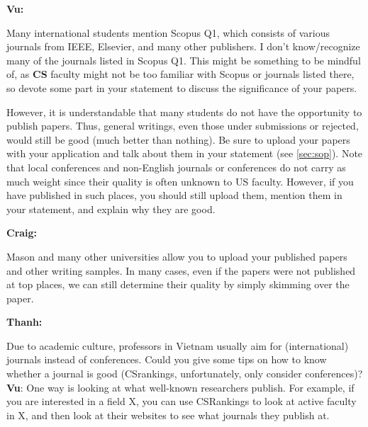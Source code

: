 \documentclass[oneside,11pt,dvipsnames]{book}
\newenvironment{commentbox}[1][]{
  \small
  \begin{mybox}
    {\small \textbf{#1}}
  }{
  \end{mybox}
}
\begin{document}
\begin{commentbox}[Vu:]
  Many international students mention Scopus Q1, which consists of various journals from IEEE, Elsevier, and many other publishers.  I don't know/recognize many of the journals listed in Scopus Q1. This might be something to be mindful of, as \textbf{CS} faculty might not be too familiar with Scopus or journals listed there, so devote some part in your statement to discuss the significance of your papers.
\end{commentbox}

However, it is understandable that many students do not have the opportunity to publish papers. Thus, general writings, even those under submissions or rejected, would still be good (much better than nothing).  Be sure to upload your papers with your application and talk about them in your statement (see \autoref{sec:sop}).  Note that local conferences and non-English journals or conferences do
not carry as much weight since their quality is often unknown to US faculty. However, if you have published in such places, you should still upload them, mention them in your statement, and explain why they are good.




\begin{commentbox}[Craig:]
  Mason and many other universities allow you to upload your published papers and other writing samples. In many cases, even if the papers were not published at top places, we can still determine their quality by simply skimming over the paper.
\end{commentbox}

\begin{commentbox}[Thanh:]
    Due to academic culture, professors in Vietnam usually aim for (international) journals instead of conferences. Could you give some tips on how to know whether a journal is good (CSrankings, unfortunately, only consider conferences)?
    \tcblower
    \textbf{Vu}: One way is looking at what well-known researchers publish. For example, if you are interested in a field X, you can use CSRankings to look at active faculty in X, and then look at their websites to see what journals they publish at.
  \end{commentbox}
\end{document}
